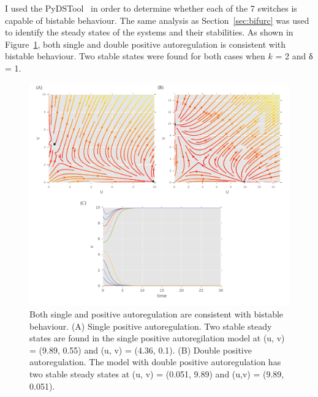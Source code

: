 I used the PyDSTool~\autocite{Clewley:2012kj} in order to determine whether each of the 7 switches is capable of bistable behaviour. The same analysis as Section~\ref{sec:bifurc} was used to identify the steady states of the systems and their stabilities. As shown in Figure~\ref{fig:Gard_pos}, both single and double positive autoregulation is consistent with bistable behaviour. Two stable states were found for both cases when $k$ = 2 and δ = 1. 


\begin{figure}[htbp]
	\begin{center}
\includegraphics[scale=0.6]{../../chapters/chapterABCSysBio/images/gard_pos.pdf}
\caption[Phase plane analysis of the switch with positive autoregulation]{\label{fig:Gard_pos}Both single and positive autoregulation are consistent with bistable behaviour.  (A) Single positive autoregulation. Two stable steady states are found in the single positive autoregilation model at (u, v) = (9.89, 0.55) and (u, v) = (4.36, 0.1). (B) Double positive autoregulation. The model with double positive autoregulation has two stable steady states at (u, v) = (0.051, 9.89) and (u,v) = (9.89, 0.051).}
\end{center}
\end{figure}



